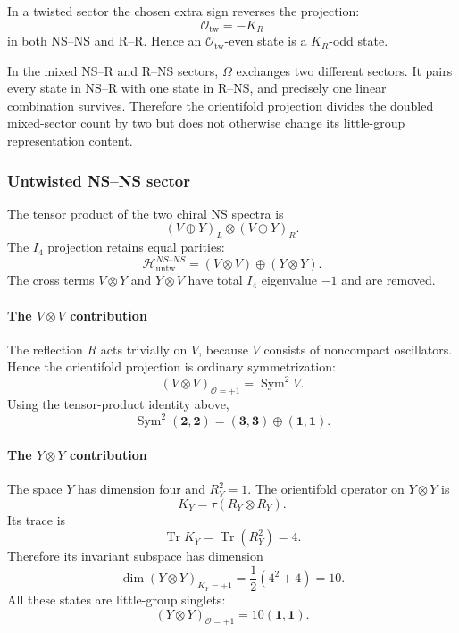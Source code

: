 \documentclass[
  10pt,
  a4paper,
  openany]{book}
\begin{document}
In a twisted sector the chosen extra sign reverses the projection: \[
\mathcal O_{\mathrm{tw}}
=
-K_R
\] in both NS--NS and R--R. Hence an \(\mathcal O_{\mathrm{tw}}\)-even
state is a \(K_R\)-odd state.

In the mixed NS--R and R--NS sectors, \(\Omega\) exchanges two different
sectors. It pairs every state in NS--R with one state in R--NS, and
precisely one linear combination survives. Therefore the orientifold
projection divides the doubled mixed-sector count by two but does not
otherwise change its little-group representation content.

\subsubsection{Untwisted NS--NS sector}\label{untwisted-nsns-sector}

The tensor product of the two chiral NS spectra is \[
(V\oplus Y)_L
\otimes
(V\oplus Y)_R.
\] The \(I_4\) projection retains equal parities: \[
\boxed{
\mathcal H_{\mathrm{untw}}^{NS\text{--}NS}
=
(V\otimes V)
\oplus
(Y\otimes Y)
}.
\] The cross terms \(V\otimes Y\) and \(Y\otimes V\) have total \(I_4\)
eigenvalue \(-1\) and are removed.

\paragraph{\texorpdfstring{The \(V\otimes V\)
contribution}{The V\textbackslash otimes V contribution}}\label{the-votimes-v-contribution}

The reflection \(R\) acts trivially on \(V\), because \(V\) consists of
noncompact oscillators. Hence the orientifold projection is ordinary
symmetrization: \[
(V\otimes V)_{\mathcal O=+1}
=
\operatorname{Sym}^2V.
\] Using the tensor-product identity above, \[
\boxed{
\operatorname{Sym}^2(\mathbf2,\mathbf2)
=
(\mathbf3,\mathbf3)
\oplus
(\mathbf1,\mathbf1)
}.
\]

\paragraph{\texorpdfstring{The \(Y\otimes Y\)
contribution}{The Y\textbackslash otimes Y contribution}}\label{the-yotimes-y-contribution}

The space \(Y\) has dimension four and \(R_Y^2=1\). The orientifold
operator on \(Y\otimes Y\) is \[
K_Y
=
\tau(R_Y\otimes R_Y).
\] Its trace is \[
\operatorname{Tr}K_Y
=
\operatorname{Tr}(R_Y^2)
=4.
\] Therefore its invariant subspace has dimension \[
\dim(Y\otimes Y)_{K_Y=+1}
=
\frac12(4^2+4)
=10.
\] All these states are little-group singlets: \[
(Y\otimes Y)_{\mathcal O=+1}
=
10(\mathbf1,\mathbf1).
\]
\end{document}
